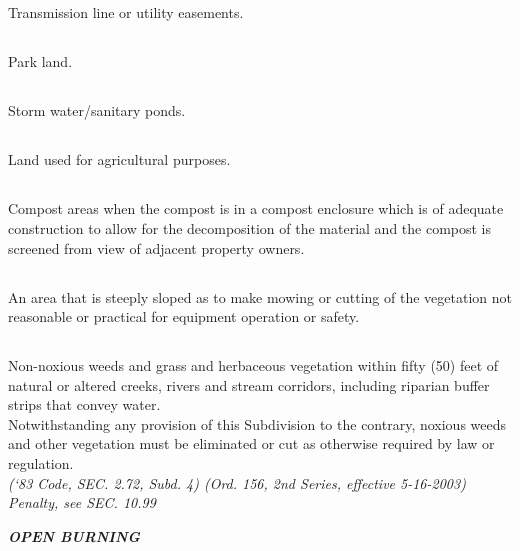 \subsection{}
Transmission line or utility easements.
\subsection{}
Park land.
\subsection{}
Storm water/sanitary ponds.
\subsection{}
Land used for agricultural purposes.
\subsection{}
Compost areas when the compost is in a compost enclosure which is of adequate construction to allow for the decomposition of the material and the compost is screened from view of adjacent property owners.
\subsection{}
An area that is steeply sloped as to make mowing or cutting of the vegetation not reasonable or practical for equipment operation or safety.
\subsection{}
Non-noxious weeds and grass and herbaceous vegetation within fifty (50) feet of natural or altered creeks, rivers and stream corridors, including riparian buffer strips that convey water.\\
Notwithstanding any provision of this Subdivision to the contrary, noxious weeds and other vegetation must be eliminated or cut as otherwise required by law or regulation.\\
\emph{(‘83 Code, SEC. 2.72, Subd. 4)  (Ord. 156, 2nd Series, effective 5-16-2003)  Penalty, see SEC. 10.99}

\begin{center}
\emph{\textbf{\LARGE{OPEN BURNING}}}
\end{center}
\setcounter{section}{59}
